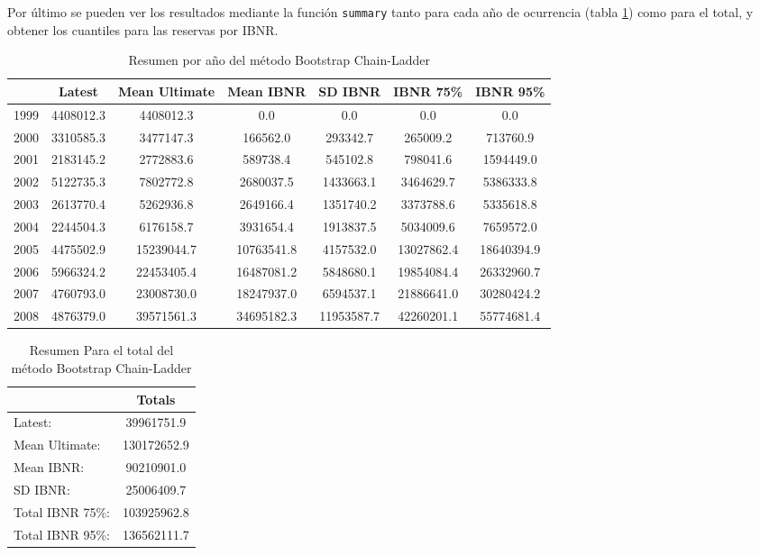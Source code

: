 \documentclass[
  12pt,
]{article}
\begin{document}
Por último se pueden ver los resultados mediante la función
\texttt{summary} tanto para cada año de ocurrencia (tabla
\ref{anual bootstrap}) como para el total, y obtener los cuantiles para
las reservas por IBNR.

\begin{table}[ht]
\centering
\caption{Resumen por año del método Bootstrap Chain-Ladder} 
\label{anual bootstrap}
\begin{tabular}{lcccccc}
  \hline
 & Latest & Mean Ultimate & Mean IBNR & SD IBNR & IBNR 75\% & IBNR 95\% \\ 
  \hline
1999 & 4408012.3 & 4408012.3 & 0.0 & 0.0 & 0.0 & 0.0 \\ 
  2000 & 3310585.3 & 3477147.3 & 166562.0 & 293342.7 & 265009.2 & 713760.9 \\ 
  2001 & 2183145.2 & 2772883.6 & 589738.4 & 545102.8 & 798041.6 & 1594449.0 \\ 
  2002 & 5122735.3 & 7802772.8 & 2680037.5 & 1433663.1 & 3464629.7 & 5386333.8 \\ 
  2003 & 2613770.4 & 5262936.8 & 2649166.4 & 1351740.2 & 3373788.6 & 5335618.8 \\ 
  2004 & 2244504.3 & 6176158.7 & 3931654.4 & 1913837.5 & 5034009.6 & 7659572.0 \\ 
  2005 & 4475502.9 & 15239044.7 & 10763541.8 & 4157532.0 & 13027862.4 & 18640394.9 \\ 
  2006 & 5966324.2 & 22453405.4 & 16487081.2 & 5848680.1 & 19854084.4 & 26332960.7 \\ 
  2007 & 4760793.0 & 23008730.0 & 18247937.0 & 6594537.1 & 21886641.0 & 30280424.2 \\ 
  2008 & 4876379.0 & 39571561.3 & 34695182.3 & 11953587.7 & 42260201.1 & 55774681.4 \\ 
   \hline
\end{tabular}
\end{table}

\begin{table}[ht]
\centering
\caption{Resumen Para el total del método Bootstrap Chain-Ladder} 
\label{total bootstrap}
\begin{tabular}{lc}
  \hline
 & Totals \\ 
  \hline
Latest: & 39961751.9 \\ 
  Mean Ultimate: & 130172652.9 \\ 
  Mean IBNR: & 90210901.0 \\ 
  SD IBNR: & 25006409.7 \\ 
  Total IBNR 75\%: & 103925962.8 \\ 
  Total IBNR 95\%: & 136562111.7 \\ 
   \hline
\end{tabular}
\end{table}
\end{document}
